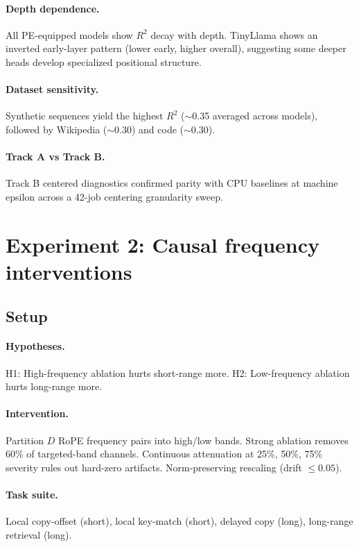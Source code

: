\documentclass{article}
\begin{document}
\paragraph{Depth dependence.} All PE-equipped models show $R^2$ decay with depth.
TinyLlama shows an inverted early-layer pattern (lower early, higher overall), suggesting
some deeper heads develop specialized positional structure.

\paragraph{Dataset sensitivity.} Synthetic sequences yield the highest $R^2$ ($\sim$0.35
averaged across models), followed by Wikipedia ($\sim$0.30) and code ($\sim$0.30).

\paragraph{Track A vs Track B.} Track B centered diagnostics confirmed parity with CPU
baselines at machine epsilon across a 42-job centering granularity sweep.

\section{Experiment 2: Causal frequency interventions}
\label{app:exp2}

\subsection{Setup}

\paragraph{Hypotheses.} H1: High-frequency ablation hurts short-range more. H2:
Low-frequency ablation hurts long-range more.

\paragraph{Intervention.} Partition $D$ RoPE frequency pairs into high/low bands. Strong
ablation removes 60\% of targeted-band channels. Continuous attenuation at 25\%, 50\%, 75\%
severity rules out hard-zero artifacts. Norm-preserving rescaling (drift $\leq 0.05$).

\paragraph{Task suite.} Local copy-offset (short), local key-match (short), delayed copy
(long), long-range retrieval (long).
\end{document}
